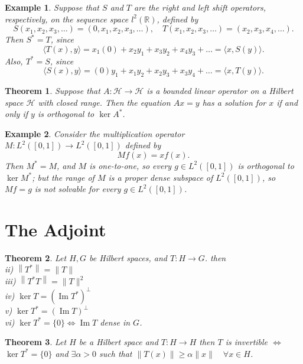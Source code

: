 \documentclass{report}
\newtheorem{thm}{Theorem}
\newtheorem{exm}{Example}
\begin{document}
\begin{exm} \label{ShiftOp}
Suppose that $S$ and $T$ are the right and left shift operators, respectively, on the sequence space $l^{2}(\mathbb{R})$, defined by
$$
S(x_{1}, x_{2}, x_{3}, \dots) = (0, x_{1}, x_{2}, x_{3}, \dots), \quad T(x_{1}, x_{2}, x_{3}, \dots) = (x_{2}, x_{3}, x_{4}, \dots).
$$
Then $S^{*}=T$, since
$$
\langle T(x), y \rangle = x_{1}(0) + x_{2}{y_{1}} + x_{3}{y_{2}} + x_{4}{y_{3}} + \dots = \langle x, S(y) \rangle.
$$
Also, $T^{*}=S$, since
$$
\langle S(x), y \rangle = (0)y_{1} + x_{1}{y_{2}} + x_{2}{y_{3}} + x_{3}{y_{4}} + \dots = \langle x, T(y) \rangle.
$$
\end{exm}


\begin{thm}
Suppose that $A:\mathcal{H}\rightarrow\mathcal{H}$ is a bounded linear operator on a Hilbert space $\mathcal{H}$ with closed range. Then the equation $Ax=y$ has a solution for $x$ if and only if $y$ is orthogonal to $\ker A^{*}$.
\end{thm}

\begin{exm}
Consider the multiplication operator $M:L^{2}([0,1])\rightarrow L^{2}([0,1])$ defined by
$$
Mf(x)=xf(x).
$$
Then $M^{*}=M$, and $M$ is one-to-one, so every $g\in L^{2}([0,1])$ is orthogonal to $\ker M^{*}$; but the range of $M$ is a proper dense subspace of $L^{2}([0,1])$, so $Mf=g$ is not solvable for every $g\in L^{2}([0,1])$.
\end{exm}


\section{The Adjoint}

\begin{thm}
Let $H, G$ be Hilbert spaces, and $T:H \rightarrow G$. then\\
ii) $\left\|T^{*}\right\|=\|T\|$\\
iii) $\left\|T^{*} T\right\|=\|T\|^{2}$\\
iv) $\operatorname{ker} T=\left(\operatorname{Im} T^{*}\right)^{\perp}$\\
v) $\operatorname{ker} T^{*}=(\operatorname{Im}T)^{\perp}$\\
vi) $\operatorname{ker} T^{*}=\{0\} \Leftrightarrow \operatorname{Im} T$ dense in $G$.
\end{thm}

\begin{thm} \label{Inv}
Let $H$ be a Hilbert space and $T: H \rightarrow H$ then $T$ is invertible $\Longleftrightarrow$  $\operatorname{ker}T^{*}=\{0\}$ and $\exists \alpha>0$ such that $\|T(x)\| \geqslant \alpha\|x\| \quad \forall x \in H$.
\end{thm}
\end{document}
